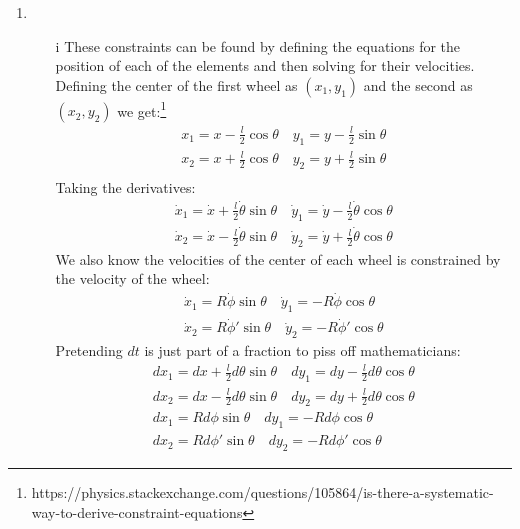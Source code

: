 \documentclass[12pt]{article}
\title{}
\author{Johannes Byle}
\begin{document}
    \maketitle
    \begin{enumerate}
        \item
        \begin{enumerate}
            \item[i] These constraints can be found by defining the equations for the position of each of the elements and then solving for their velocities.
            Defining the center of the first wheel as $(x_1,y_1)$ and the second as $(x_2,y_2)$ we get:\footnote{https://physics.stackexchange.com/questions/105864/is-there-a-systematic-way-to-derive-constraint-equations}
            \begin{gather*}
                x_1=x-\frac{l}{2}\cos\theta\quad y_1=y-\frac{l}{2}\sin\theta\\
                x_2=x+\frac{l}{2}\cos\theta\quad y_2=y+\frac{l}{2}\sin\theta\\
            \end{gather*}
            Taking the derivatives:
            \begin{gather*}
                \dot{x}_1=\dot{x}+\frac{l}{2}\dot{\theta}\sin\theta\quad \dot{y}_1=\dot{y}-\frac{l}{2}\dot{\theta}\cos\theta\\
                \dot{x}_2=\dot{x}-\frac{l}{2}\dot{\theta}\sin\theta\quad \dot{y}_2=\dot{y}+\frac{l}{2}\dot{\theta}\cos\theta
            \end{gather*}
            We also know the velocities of the center of each wheel is constrained by the velocity of the wheel:
            \begin{gather*}
                \dot{x}_1=R\dot{\phi}\sin\theta\quad \dot{y}_1=-R\dot{\phi}\cos\theta\\
                \dot{x}_2=R\dot{\phi}'\sin\theta\quad \dot{y}_2=-R\dot{\phi}'\cos\theta
            \end{gather*}
            Pretending $dt$ is just part of a fraction to piss off mathematicians:
            \begin{gather*}
                dx_1=dx+\frac{l}{2}d\theta\sin\theta\quad dy_1=dy-\frac{l}{2}d\theta\cos\theta\\
                dx_2=dx-\frac{l}{2}d\theta\sin\theta\quad dy_2=dy+\frac{l}{2}d\theta\cos\theta\\
                dx_1=Rd\phi\sin\theta\quad dy_1=-Rd\phi\cos\theta\\
                dx_2=Rd\phi'\sin\theta\quad dy_2=-Rd\phi'\cos\theta
            \end{gather*}
        \end{enumerate}
    \end{enumerate}
\end{document}
